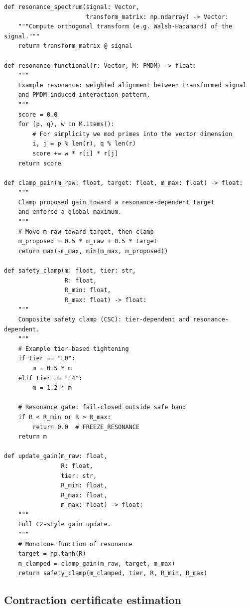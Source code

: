 \documentclass[11pt]{article}
\begin{document}
\begin{verbatim}
def resonance_spectrum(signal: Vector,
                       transform_matrix: np.ndarray) -> Vector:
    """Compute orthogonal transform (e.g. Walsh-Hadamard) of the signal."""
    return transform_matrix @ signal

def resonance_functional(r: Vector, M: PMDM) -> float:
    """
    Example resonance: weighted alignment between transformed signal
    and PMDM-induced interaction pattern.
    """
    score = 0.0
    for (p, q), w in M.items():
        # For simplicity we mod primes into the vector dimension
        i, j = p % len(r), q % len(r)
        score += w * r[i] * r[j]
    return score

def clamp_gain(m_raw: float, target: float, m_max: float) -> float:
    """
    Clamp proposed gain toward a resonance-dependent target
    and enforce a global maximum.
    """
    # Move m_raw toward target, then clamp
    m_proposed = 0.5 * m_raw + 0.5 * target
    return max(-m_max, min(m_max, m_proposed))

def safety_clamp(m: float, tier: str,
                 R: float,
                 R_min: float,
                 R_max: float) -> float:
    """
    Composite safety clamp (CSC): tier-dependent and resonance-dependent.
    """
    # Example tier-based tightening
    if tier == "L0":
        m = 0.5 * m
    elif tier == "L4":
        m = 1.2 * m

    # Resonance gate: fail-closed outside safe band
    if R < R_min or R > R_max:
        return 0.0  # FREEZE_RESONANCE
    return m

def update_gain(m_raw: float,
                R: float,
                tier: str,
                R_min: float,
                R_max: float,
                m_max: float) -> float:
    """
    Full C2-style gain update.
    """
    # Monotone function of resonance
    target = np.tanh(R)
    m_clamped = clamp_gain(m_raw, target, m_max)
    return safety_clamp(m_clamped, tier, R, R_min, R_max)
\end{verbatim}

\subsection{Contraction certificate estimation}
\end{document}
